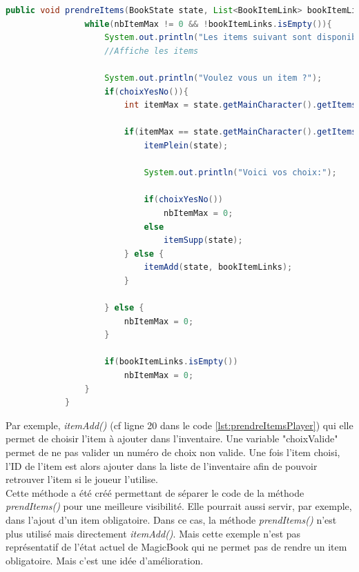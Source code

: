 		\begin{lstlisting}[gobble=12, language=java, label=lst:prendreItemsPlayer, caption=prendreItems() du Player]
			public void prendreItems(BookState state, List<BookItemLink> bookItemLinks, int nbItemMax){
				while(nbItemMax != 0 && !bookItemLinks.isEmpty()){
					System.out.println("Les items suivant sont disponible:");
					//Affiche les items

					System.out.println("Voulez vous un item ?");
					if(choixYesNo()){
						int itemMax = state.getMainCharacter().getItemsMax();

						if(itemMax == state.getMainCharacter().getItems().size()){
							itemPlein(state);

							System.out.println("Voici vos choix:");

							if(choixYesNo())
								nbItemMax = 0;
							else
								itemSupp(state);
						} else {
							itemAdd(state, bookItemLinks);
						}

					} else {
						nbItemMax = 0;
					}

					if(bookItemLinks.isEmpty())
						nbItemMax = 0;
				}
			}

		\end{lstlisting}

		Par exemple, \textit{itemAdd()} (cf ligne 20 dans le code \ref{lst:prendreItemsPlayer}) qui elle permet de choisir l'item à ajouter dans l'inventaire. Une variable "choixValide" permet de ne pas valider un numéro de choix non valide. Une fois l'item choisi, l'ID de l'item est alors ajouter dans la liste de l'inventaire afin de pouvoir retrouver l'item si le joueur l'utilise.\\
		Cette méthode a été créé permettant de séparer le code de la méthode \textit{prendItems()} pour une meilleure visibilité. Elle pourrait aussi servir, par exemple, dans l'ajout d'un item obligatoire. Dans ce cas, la méthode \textit{prendItems()} n'est plus utilisé mais directement \textit{itemAdd()}. Mais cette exemple n'est pas représentatif de l'état actuel de MagicBook qui ne permet pas de rendre un item obligatoire. Mais c'est une idée d'amélioration.\\

